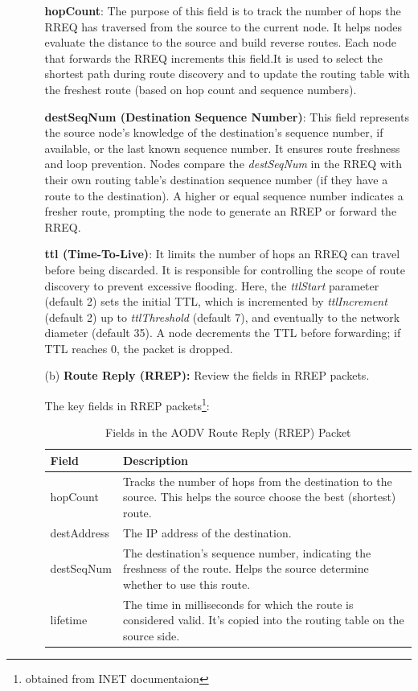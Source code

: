 \documentclass[a4paper]{article}
\begin{document}
\begin{enumerate}
\begin{itemize}
				\textbf{hopCount}:
				The purpose of this field is to track the number of hops the RREQ has traversed from the source to the current node.
				It helps nodes evaluate the distance to the source and build reverse routes. Each node that forwards the RREQ increments this field.It is used to select the shortest path during route discovery and to update the routing table with the freshest route (based on hop count and sequence numbers).
				
				\pagebreak
				
				\textbf{destSeqNum (Destination Sequence Number)}:
				This field represents the source node’s knowledge of the destination’s sequence number, if available, or the last known sequence number.
				It ensures route freshness and loop prevention. Nodes compare the \textit{destSeqNum} in the RREQ with their own routing table’s destination sequence number (if they have a route to the destination). A higher or equal sequence number indicates a fresher route, prompting the node to generate an RREP or forward the RREQ.
				
				\textbf{ttl (Time-To-Live)}:
				It limits the number of hops an RREQ can travel before being discarded.
				It is responsible for controlling the scope of route discovery to prevent excessive flooding. Here, the \textit{ttlStart} parameter (default 2) sets the initial TTL, which is incremented by \textit{ttlIncrement} (default 2) up to \textit{ttlThreshold} (default 7), and eventually to the network diameter (default 35). A node decrements the TTL before forwarding; if TTL reaches 0, the packet is dropped.
				
				\item[(b)] \textbf{Route Reply (RREP):} Review the fields in RREP packets.
				
				The key fields in RREP packets\footnote{obtained from INET documentaion}:
				
				\begin{table}[!h]
					\centering
					\begin{tabular}{| p{3cm} | p{10cm} |}
						\hline
						\textbf{Field} & \textbf{Description} \\\hline
						hopCount & Tracks the number of hops from the destination to the source. This helps the source choose the best (shortest) route. \\\hline
						destAddress & The IP address of the destination. \\\hline
						destSeqNum & The destination’s sequence number, indicating the freshness of the route. Helps the source determine whether to use this route. \\\hline
						lifetime & The time in milliseconds for which the route is considered valid. It’s copied into the routing table on the source side. \\\hline
					\end{tabular}
					\caption{Fields in the AODV Route Reply (RREP) Packet}
				\end{table}
				

\end{itemize}
\end{enumerate}
\end{document}
